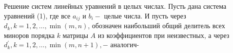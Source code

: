 \documentclass[10pt]{article}
\begin{document}
Решение систем линейных уравнений в целых числах. Пусть дана система уравнений (1), где все $a_{i j}$ и $b_{i}-$ целые числа. И пусть через $d_{k}, k=1,2, \ldots, \min (m, n)$, обозначен наибольший общий делитель всех миноров порядка $k$ матрицы $A$ из коэффициентов при неизвестных, а через $d_{k}^{\prime}, k=1,2, \ldots, \min (m, n+1),-$ аналогич-
\end{document}

